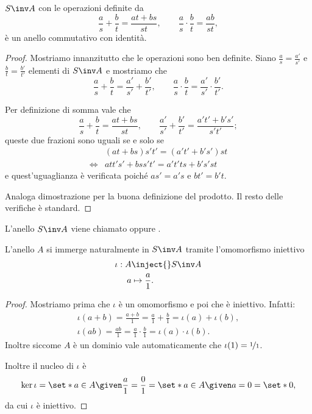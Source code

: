 \begin{proposition}
    $S\inv A$ con le operazioni definite da \[
        \frac{a}{s} + \frac{b}{t} = \frac{at + bs}{st}, \qquad \frac{a}{s} \cdot \frac{b}{t} = \frac{ab}{st},    
    \] è un anello commutativo con identità.
\end{proposition}
\begin{proof}
    Mostriamo innanzitutto che le operazioni sono ben definite. Siano $\frac{a}{s} = \frac{a'}{s'}$ e $\frac{b}{t} = \frac{b'}{t'}$ elementi di $S\inv A$ e mostriamo che \[
        \frac{a}{s} + \frac{b}{t} = \frac{a'}{s'} + \frac{b'}{t'}, \qquad \frac{a}{s} \cdot \frac{b}{t} = \frac{a'}{s'} \cdot \frac{b'}{t'}.
    \]

    Per definizione di somma vale che \[
        \frac{a}{s} + \frac{b}{t} = \frac{at + bs}{st}, \qquad \frac{a'}{s'} + \frac{b'}{t'} = \frac{a't' + b's'}{s't'};       
    \] queste due frazioni sono uguali se e solo se \begin{align*}
        &(at + bs)s't' = (a't' + b's')st\\
        \iff &att's' + bss't' = a't'ts + b's'st
    \end{align*} e quest'uguaglianza è verificata poiché $as' = a's$ e $bt' = b't$.

    Analoga dimostrazione per la buona definizione del prodotto. Il resto delle verifiche è standard.
\end{proof}

L'anello $S\inv A$ viene chiamato  oppure .

\begin{proposition}
    L'anello $A$ si immerge naturalmente in $S\inv A$ tramite l'omomorfismo iniettivo \begin{align*}
        \iota: A &\inject{} S\inv A\\
        a &\mapsto \frac{a}{1}.
    \end{align*}
\end{proposition}
\begin{proof}
    Mostriamo prima che $\iota$ è un omomorfismo e poi che è iniettivo. Infatti: \begin{align*}
        \iota(a + b) = \frac{a + b}{1} = \frac{a}{1} + \frac{b}{1} = \iota(a) + \iota(b),\\
        \iota(ab) = \frac{ab}{1} = \frac{a}{1}\cdot \frac{b}{1} = \iota(a) \cdot \iota(b). 
    \end{align*}
    Inoltre siccome $A$ è un dominio vale automaticamente che $\iota(1) = \nicefrac{1}{1}$.

    Inoltre il nucleo di $\iota$ è \[
        \ker \iota = \set*{a \in A \given \frac{a}{1} = \frac{0}{1}} = \set*{a \in A \given a = 0} = \set*{0},    
    \] da cui $\iota$ è iniettivo.
\end{proof}

